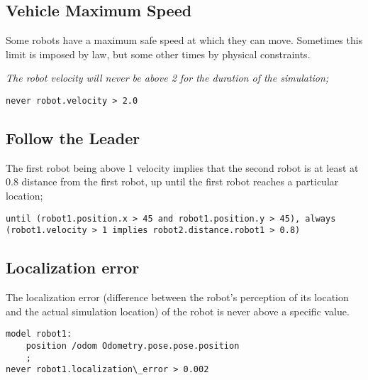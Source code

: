 \subsection{Vehicle Maximum Speed}
\label{sec:speedexample}

Some robots have a maximum safe speed at which they can move. Sometimes this limit is imposed by law, but some other times by physical constraints.

\textit{The robot velocity will never be above 2 for the duration of the simulation;}

\begin{lstlisting}
never robot.velocity > 2.0	
\end{lstlisting}


\subsection{Follow the Leader}
\label{ssec:followexample}

The first robot being above 1 velocity implies that the second robot is at least at 0.8 distance from the first robot, up until the first robot reaches a particular location;

\begin{lstlisting}
until (robot1.position.x > 45 and robot1.position.y > 45), always (robot1.velocity > 1 implies robot2.distance.robot1 > 0.8)
\end{lstlisting}


\subsection{Localization error}
\label{ssec:localizationexample}

The localization error (difference between the robot's perception of its location and the actual simulation location) of the robot is never above a specific value.

\begin{lstlisting}
model robot1:
    position /odom Odometry.pose.pose.position
    ;
never robot1.localization\_error > 0.002
\end{lstlisting}


